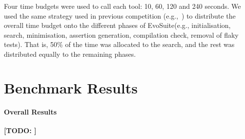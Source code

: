 \documentclass[sigconf,table]{acmart}
\newcommand{\TODO}[1]{\textbf{\textcolor{ScarletRed}{[TODO: #1]}}\xspace}
\newcommand{\TODO}[1]{}
\newcommand{\EVOSUITE}{{\sc EvoSuite}\xspace}
\newcommand{\TT}{{\sc T3}\xspace}
\begin{document}
Four time budgets were used to call each tool: 10, 60, 120 and 240
seconds. We used the same strategy used in previous competition
(e.g.,~\cite{evosuiteAtSbst2016}) to distribute the overall time
budget onto the different phases of \EVOSUITE (e.g., initialisation,
search, minimisation, assertion generation, compilation check, removal
of flaky tests). That is, 50\% of the time was allocated to the
search, and the rest was distributed equally to the remaining phases.


\section{Benchmark Results}

\begin{table*}[t]
  \centering
  \caption{\label{table:results}Detailed results of \EVOSUITE on the
    SBST benchmark classes.}
\vspace{-1em}
\resizebox{\textwidth}{!}{  

}	
\end{table*}

\begin{table*}[t]
  \centering
  \caption{\label{table:t3_results}Detailed results of \TT on the
    SBST benchmark classes.}
\vspace{-1em}
\resizebox{\textwidth}{!}{  

}	
\end{table*}

% 

% 

\paragraph{Overall Results}

\TODO{}

\end{document}
